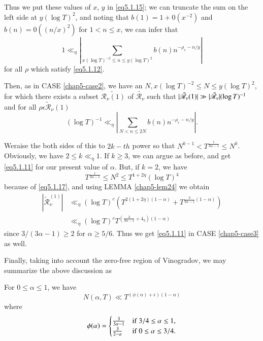 Thus we put these values of $x$, $y$ in \eqref{eq5.1.15}; we can
truncate the sum 
on the left side at $y (\log T)^2$, and noting that $b (1) = 1 + 0
(x^{-2})$ and $b(n) = 0 (( n /x)^2)$ for $1<n\leq x$, we can infer
that 
$$
1 \ll _\eta | \sum_{x (\log T)^{-2} \leq n \leq y (\log T)^2 } b (n) n
^{- \rho _{e}-n /y}| 
$$
for all $\rho$ which satisfy \eqref{eq5.1.12}.

Then, as in CASE \ref{chap5-case2},  we have an $N,  x (\log T)^{-2}
\leq N \leq y (\log T)^2$, for which there exists a subset
$\tilde{\mathscr{R}_{\nu} (1)}$ of $\tilde{\mathscr{R}_{\nu}}$ such that
$|\tilde{\mathscr{R}}_{\nu} (1) | \gg |\tilde{\mathscr{R}}_{\nu}|\break
(\log T)^{-1}$ and for all $\rho \epsilon  \tilde{\mathscr{R}}_{\nu}
(1)$ 
$$
(\log T)^{-1} \ll _{\eta} |\sum_{N < n \leq 2N} b(n) n ^{- \rho _e -n /y}|.
$$

We\pageoriginale raise the both sides of this to $2k - th$ power so that $N ^{k-1} <
T^{\frac{1}{3 \alpha -1}} \leq N^k $. Obviously,  we have $2\leq k
\ll_{\eta} 1$. If $k \geq 3$, we can argue as before,  and get
\eqref{eq5.1.11} for our present value of $\alpha$. But, if $k= 2$, we have 
$$
T^{\frac{1}{3 \alpha -1}} \leq N^2 \leq T^{1 + 2\eta}(\log T)^4
$$
because of \eqref{eq5.1.17},  and using LEMMA \ref{chap5-lem24} we obtain
\begin{align*}
  |\tilde{\mathscr{R}}_{\nu}^(1) | &  \ll _{\eta} (\log T)^c \left(T ^{2 (1
    + 2\eta ) (1 - \alpha )}+ T^{\frac{3}{3 \alpha -1} (1-\alpha )}\right)\\ 
  &  \ll _{\eta} (\log T)^c T ^{\left(\frac{3}{3 \alpha -1} + 4 _{\eta} \right)(1 -\alpha )}
 \end{align*} 
  since $3/ (3 \alpha -1) \geq 2 $ for $\alpha \geq 5/6$. Thus we get
  \eqref{eq5.1.11} in CASE \ref{chap5-case3} as well. 
 
 Finally, taking into account the zero-free region of Vinogradov, we
 may summarize the above discussion as  

\begin{theorem}\label{chap5-thm14}
For $ 0 \leq \alpha \leq 1$, we have
$$
N(\alpha, T) \ll T^{(\phi (\alpha) + \epsilon ) (1 - \alpha)}
$$
where
$$
\phi (\alpha)= 
  \begin{cases}
    \frac{3}{3 \alpha -1} & {\rm if}~ 3/4 \leq \alpha \leq 1,\\
    \frac{3}{2-\alpha}  &{\rm if}~ 0 \leq \alpha \leq 3/4.
  \end{cases}
$$
\end{theorem} 
 
